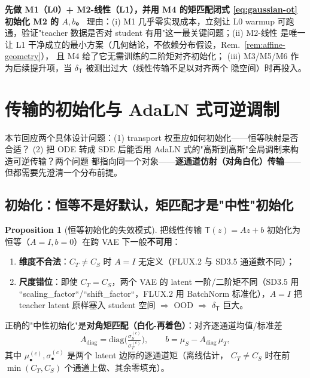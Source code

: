 \documentclass[11pt,a4paper]{article}
\newcommand{\Tmap}{\mathsf{T}}
\theoremstyle{definition}
\newtheorem{proposition}{Proposition}
\begin{document}
\begin{tcolorbox}[colback=yellow!6,colframe=orange!60!black,title=推荐路线]
\textbf{先做 M1（L0）+ M2-线性（L1），并用 M4 的矩匹配闭式
\eqref{eq:gaussian-ot} 初始化 M2 的 $A,b$。} 理由：(i) M1 几乎零实现成本，立刻让
L0 warmup 可跑通，验证"teacher 数据是否对 student 有用"这一最关键问题；(ii) M2-线性
是唯一让 L1 干净成立的最小方案（几何结论，不依赖分布假设，Rem.~\ref{rem:affine-geometry}），
且 M4 给了它无需训练的二阶矩对齐初始化；
(iii) M3/M5/M6 作为后续提升项，当 $\delta_{\Tmap}$ 被测出过大（线性传输不足以对齐两个
隐空间）时再投入。
\end{tcolorbox}

\section{传输的初始化与 AdaLN 式可逆调制}
\label{sec:init-adaln}

本节回应两个具体设计问题：(1) transport 权重应如何初始化——恒等映射是否合适？
(2) 把 ODE 转成 SDE 后能否用 AdaLN 式的"高斯到高斯"全局调制来构造可逆传输？两个问题
都指向同一个对象——\textbf{逐通道仿射（对角白化）传输}——但都需要先澄清一个分布前提。

\subsection{初始化：恒等不是好默认，矩匹配才是"中性"初始化}

\begin{proposition}[恒等初始化的失效模式]
\label{prop:identity-bad}
把线性传输 $\Tmap(z)=Az+b$ 初始化为恒等（$A=I,b=0$）在跨 VAE 下一般\textbf{不可用}：
\begin{enumerate}[leftmargin=1.6em,label=(\alph*)]
\item \textbf{维度不合法}：$C_T\neq C_S$ 时 $A=I$ 无定义（FLUX.2 与 SD3.5 通道数不同）；
\item \textbf{尺度错位}：即使 $C_T=C_S$，两个 VAE 的 latent 一阶/二阶矩不同（SD3.5 用
``scaling\_factor``/``shift\_factor``，FLUX.2 用 BatchNorm 标准化），$A=I$ 把 teacher
latent 原样塞入 student 空间 $\Rightarrow$ OOD $\Rightarrow$ $\delta_{\Tmap}$ 巨大。
\end{enumerate}
\end{proposition}

正确的"中性初始化"是\textbf{对角矩匹配（白化-再着色）}：对齐逐通道均值/标准差
\begin{equation}
A_{\mathrm{diag}}=\mathrm{diag}\!\Big(\tfrac{\sigma_S^{(c)}}{\sigma_T^{(c)}}\Big),
\qquad
b=\mu_S-A_{\mathrm{diag}}\,\mu_T,
\label{eq:diag-mm}
\end{equation}
其中 $\mu_\bullet^{(c)},\sigma_\bullet^{(c)}$ 是两个 latent 边际的逐通道矩（离线估计，
$C_T\neq C_S$ 时在前 $\min(C_T,C_S)$ 个通道上做、其余零填充）。
\end{document}
